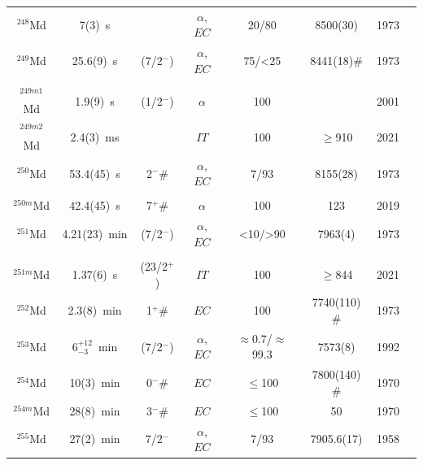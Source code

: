 \begin{center}
\begin{longtable}{c|ccccccl}
$^{248}$Md	& 7(3)~s		&  			&$\alpha$, $EC$		&20/80		& 8500(30)		    &1973	&{\tiny\cite{Eskola1973,Gangrsky1980,Hessberger2001,Nelson2008}}\\
$^{249}$Md	& 25.6(9)~s		& (7/2$^-$)	&$\alpha$, $EC$		&75/<25		& 8441(18)$\#$		&1973	&{\tiny\cite{Eskola1973,Hessberger1985,Hessberger2001,Gates2008a,Ito2018,Briselet2019}}\\
			& 				&			&					&			&				    &		&{\tiny\cite{Briselet2020,Goigoux2021}}\\
$^{249m1}$Md& 1.9(9)~s		& (1/2$^-$)	&$\alpha$			&100		& 				    &2001	&{\tiny\cite{Hessberger2001,Kuusiniemi2005}}\\
$^{249m2}$Md& 2.4(3)~ms		& 		 	&$IT$				&100		&$\geq$910 		    &2021	&{\tiny\cite{Goigoux2021}}\\
$^{250}$Md	& 53.4(45)~s	& 2$^- \#$	&$\alpha$, $EC$		&7/93		& 8155(28)		    &1973	&{\tiny\cite{Eskola1973,Gangrsky1980,Hessberger1985,Ito2018,Antalic2008,Gates2008a}}\\
			& 				&          	&					&			&				    &		&{\tiny\cite{Vostinar2019}}\\
$^{250m}$Md	& 42.4(45)~s	& 7$^+ \#$	&$\alpha$			&100		& 123			    &2019	&{\tiny\cite{Vostinar2019}}\\
$^{251}$Md	& 4.21(23)~min	& (7/2$^-$) &$\alpha$, $EC$		&<10/>90	& 7963(4)			&1973	&{\tiny\cite{Eskola1973,Greenlees2005,Chatillon2006,Ketelhut2009,Ito2018,Briselet2020}}\\
			& 				&			&					&			&				    &		&{\tiny\cite{Goigoux2021}}\\
$^{251m}$Md	& 1.37(6)~s		& (23/2$^+$)&$IT$				&100		&$\geq$844		    &2021	&{\tiny\cite{Goigoux2021}}\\
$^{252}$Md	& 2.3(8)~min	& 1$^+ \#$ 	&$EC$				&100		& 7740(110)$\#$	    &1973	&{\tiny\cite{Donets1966,Eskola1973,Ito2018}}\\
$^{253}$Md	& 6$^{+12}_{-3}$~min&  (7/2$^-$)&$\alpha$, $EC$	&$\approx$0.7/$\approx$99.3&7573(8)&1992&{\tiny\cite{Kadkhodayan1992,Hessberger2005,Antalic2011,Hessberger2012}}\\
$^{254}$Md	& 10(3)~min		& 0$^- \#$ 	&$EC$				&$\leq$100	& 7800(140)$\#$	    &1970	&{\tiny\cite{Fields1970}}\\
$^{254m}$Md	& 28(8)~min		& 3$^- \#$  &$EC$				&$\leq$100	& 50				&1970	&{\tiny\cite{Fields1970}}\\
$^{255}$Md	& 27(2)~min		&  7/2$^-$	&$\alpha$, $EC$		&7/93		& 7905.6(17)		&1958	&{\tiny\cite{Phillips1958,Sikkeland1965,Fields1970,Hoff1971,Ahmad2000,Holden2000}}\\

\end{longtable}
\end{center}
